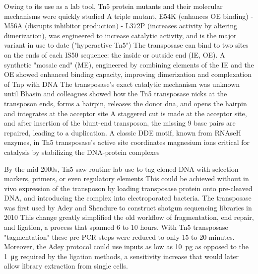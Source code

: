 Owing to its use as a lab tool, Tn5 protein mutants and their molecular mechanisms were quickly studied A triple mutant, E54K (enhances OE binding) - M56A (disrupts inhibitor production) - L372P (increases activity by altering dimerization), was engineered to increase catalytic activity, and is the major variant in use to date ("hyperactive Tn5") The transposase can bind to two sites on the ends of each IS50 sequence: the inside or outside end (IE, OE). A synthetic "mosaic end" (ME), engineered by combining elements of the IE and the OE showed enhanced binding capacity, improving dimerization and complexation of Tnp with DNA The transposase's exact catalytic mechanism was unknown until Bhasin and colleagues showed how the Tn5 transposase nicks at the transposon ends, forms a hairpin, releases the donor dna, and opens the hairpin and integrates at the acceptor site A staggered cut is made at the acceptor site, and after insertion of the blunt-end transposon, the missing 9 base pairs are repaired, leading to a duplication. A classic DDE motif, known from RNAseH enzymes, in Tn5 transposase's active site coordinates magnesium ions critical for catalysis by stabilizing the DNA-protein complexes

By the mid 2000s, Tn5 saw routine lab use to tag cloned DNA with selection markers, primers, or even regulatory elements This could be achieved without in vivo expression of the transposon by loading transposase protein onto pre-cleaved DNA, and introducing the complex into electroporated bacteria. The transposase was first used by Adey and Shendure to construct shotgun sequencing libraries in 2010 This change greatly simplified the old workflow of fragmentation, end repair, and ligation, a process that spanned 6 to 10 hours. With Tn5 transposase "tagmentation"\llap{,} these pre-PCR steps were reduced to only 15 to 20 minutes. Moreover, the Adey protocol could use inputs as low as \SI{10}{\pico\gram} as opposed to the \SI{1}{\micro\gram} required by the ligation methods, a sensitivity increase that would later allow library extraction from single cells.

